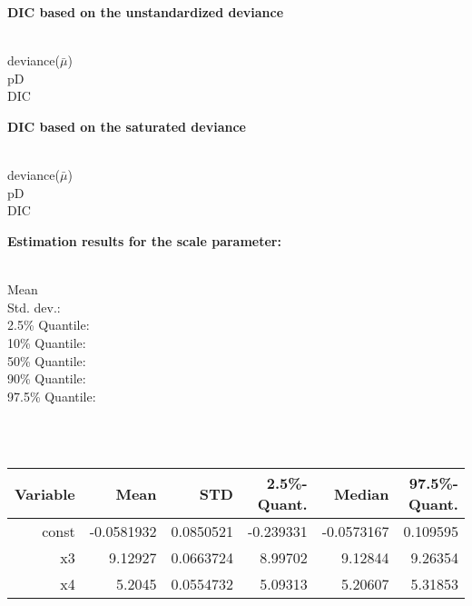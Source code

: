 \documentclass[a4paper, 12pt]{article}
\begin{document}
{\bf DIC based on the unstandardized deviance } 

\vspace{-0.4cm}
\begin{tabbing}
\hspace{3cm} \= \\
deviance($\bar{\mu}$)  \\
pD   \\
DIC   \\
\end{tabbing}

{\bf DIC based on the saturated deviance } 

\vspace{-0.4cm}
\begin{tabbing}
\hspace{3cm} \= \\
deviance($\bar{\mu}$)  \\
pD  \\
DIC  \\
\end{tabbing}


 {\bf \large Estimation results for the scale parameter: }\\ 

\vspace{-0.4cm}
\begin{tabbing}
\hspace{3cm} \= \\
Mean   \\
Std. dev.:   \\
  2.5\% Quantile:   \\
  10\% Quantile:   \\
  50\% Quantile:   \\
  90\% Quantile:   \\
  97.5\% Quantile:   \\
\end{tabbing}


\newpage 


\\
\\
\begin{tabular}{|r|rrrrr|}
\hline
Variable & Mean & STD & 2.5\%-Quant. & Median & 97.5\%-Quant.\\
\hline
const & -0.0581932 & 0.0850521 & -0.239331 & -0.0573167 & 0.109595\\
x3 & 9.12927 & 0.0663724 & 8.99702 & 9.12844 & 9.26354\\
x4 & 5.2045 & 0.0554732 & 5.09313 & 5.20607 & 5.31853\\
\hline 
\end{tabular}
\end{document}

